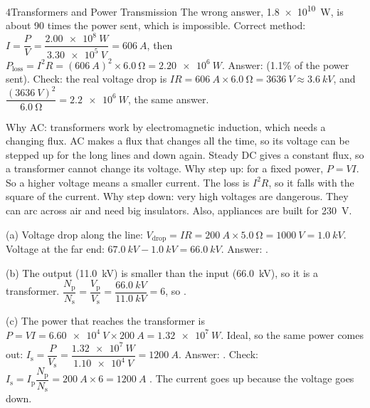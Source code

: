 \begin{chapteranswers}{4}{Transformers and Power Transmission}
        The wrong answer, \qty{1.8e10}{W}, is about 90 times the power sent, which is
        impossible. Correct method:
        $I = \dfrac{P}{V} = \dfrac{\qty{2.00e8}{W}}{\qty{3.30e5}{V}} = \qty{606}{A}$, then
        $P_\mathrm{loss} = I^2R = (\qty{606}{A})^2 \times \qty{6.0}{\ohm}
        = \qty{2.20e6}{W}$. Answer:  (1.1\% of
        the power sent). Check: the real voltage drop is
        $IR = \qty{606}{A} \times \qty{6.0}{\ohm} = \qty{3636}{V} \approx \qty{3.6}{kV}$,
        and $\dfrac{(\qty{3636}{V})^2}{\qty{6.0}{\ohm}} = \qty{2.2e6}{W}$, the same
        answer.
  \item Why AC: transformers work by electromagnetic induction, which needs a changing
        flux. AC makes a flux that changes all the time, so its voltage can be stepped up
        for the long lines and down again. Steady DC gives a constant flux, so a
        transformer cannot change its voltage. Why step up: for a fixed power,
        $P = VI$. So a higher voltage means a smaller current. The loss is $I^2R$, so it
        falls with the square of the current. Why step down: very high voltages are
        dangerous. They can arc across air and need big insulators. Also, appliances are
        built for \qty{230}{V}.
        \begin{markingcriteria}
        \end{markingcriteria}
  \item (a) Voltage drop along the line:
        $V_\mathrm{drop} = IR = \qty{200}{A} \times \qty{5.0}{\ohm} = \qty{1000}{V}
        = \qty{1.0}{kV}$. Voltage at the far end:
        $\qty{67.0}{kV} - \qty{1.0}{kV} = \qty{66.0}{kV}$.
        Answer: .\par
        (b) The output (\qty{11.0}{kV}) is smaller than the input (\qty{66.0}{kV}), so it
        is a  transformer.
        $\dfrac{N_\mathrm{p}}{N_\mathrm{s}} = \dfrac{V_\mathrm{p}}{V_\mathrm{s}}
        = \dfrac{\qty{66.0}{kV}}{\qty{11.0}{kV}} = 6$, so .\par
        (c) The power that reaches the transformer is
        $P = VI = \qty{6.60e4}{V} \times \qty{200}{A} = \qty{1.32e7}{W}$. Ideal, so the
        same power comes out:
        $I_\mathrm{s} = \dfrac{P}{V_\mathrm{s}} = \dfrac{\qty{1.32e7}{W}}{\qty{1.10e4}{V}}
        = \qty{1200}{A}$. Answer: . Check:
        $I_\mathrm{s} = I_\mathrm{p}\dfrac{N_\mathrm{p}}{N_\mathrm{s}}
        = \qty{200}{A} \times 6 = \qty{1200}{A}$ \cmark. The current goes up because the
        voltage goes down.
\end{chapteranswers}
